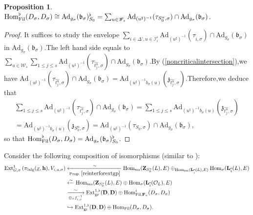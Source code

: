 \documentclass[10pt]{article}
\newtheorem{pro}[thm]{Proposition}
\newcommand{\fil}{{\rm Fil}}
\newcommand{\homo}{{\rm Hom}}
\newcommand{\ext}{{\rm Ext}}
\newcommand{\sm}{{\rm sm}}
\newcommand{\lalg}{{\rm lalg}}
\newcommand{\gr}{{\rm gr}}
\newcommand{\Dpik}{{\mathbf{D}}}
\newcommand{\bF}{{\mathbf{F}}}
\newcommand{\bL}{{\mathbf{L}}}
\newcommand{\bZ}{{\mathbf{Z}}}
\newcommand{\bh}{{\mathbf{h}}}
\newcommand{\cI}{\mathcal I}
\newcommand{\cO}{\mathcal O}
\newcommand{\fb}{{\mathfrak{b}}}
\newcommand{\fz}{{\mathfrak{z}}}
\newcommand{\sW}{\mathscr W}
\begin{document}
\begin{pro}\label{dfnisoforflatfilhomo}
	$\homo^{\flat}_{\fil}(D_{\sigma},D_{\sigma})\cong \mathrm{Ad}_{g_{\sigma}}(\fb_{\sigma})_{S_0}^{\flat}=\sum_{u\in \sW_s}\mathrm{Ad}_{(u^{\sharp})^{-1}}(\tau_{S^u_0,\sigma})\cap \mathrm{Ad}_{g_{\sigma}}(\fb_{\sigma})$.\;
\end{pro}
\begin{proof}
	It suffices to study the envelope $\sum_{i\in\Delta',u\in \cI_{i}^{\flat}}\mathrm{Ad}_{(u^{\sharp})^{-1}}(\tau_{\widehat{i},\sigma})\cap \mathrm{Ad}_{g_{\sigma}}(\fb_{\sigma})$ in $\mathrm{Ad}_{g_{\sigma}}(\fb_{\sigma})$.\;The left hand side equals to 
	$\sum_{u\in \sW_s}\sum_{1\leq j\leq s}\mathrm{Ad}_{(u^{\sharp})^{-1}}(\tau_{\widehat{t^u_j},\sigma})\cap \mathrm{Ad}_{g_{\sigma}}(\fb_{\sigma})$.\;By (\ref{noncriticalintersection}),\;we have $\mathrm{Ad}_{(u^{\sharp})^{-1}}(\tau_{\widehat{{t^u_j}},\sigma})\cap \mathrm{Ad}_{g_{\sigma}}(\fb_{\sigma})=\mathrm{Ad}_{(u^{\sharp})^{-1}b_{\sigma}(u)}(\fz_{\widehat{t^u_j},\sigma})$.\;Therefore,\;we deduce that 
	\begin{equation}
		\begin{aligned}
			\sum_{1\leq j\leq s}\mathrm{Ad}_{(u^{\sharp})^{-1}}(\tau_{\widehat{t^u_j},\sigma})\cap \mathrm{Ad}_{g_{\sigma}}(\fb_{\sigma})=\sum_{1\leq j\leq s}\mathrm{Ad}_{(u^{\sharp})^{-1}b_{\sigma}(u)}(\fz_{\widehat{t^u_j},\sigma})\\
			=\mathrm{Ad}_{(u^{\sharp})^{-1}b_{\sigma}(u)}(\fz_{S^u_0,\sigma})=\mathrm{Ad}_{(u^{\sharp})^{-1}}(\tau_{S_0,\sigma})\cap \mathrm{Ad}_{g_{\sigma}}(\fb_{\sigma}),
		\end{aligned}
	\end{equation}
	so that $\homo^{\flat}_{\fil}(D_{\sigma},D_{\sigma})=\mathrm{Ad}_{g_{\sigma}}(\fb_{\sigma})_{S_0}^{\flat}$.\;
\end{proof}
Consider the following composition of isomorphisms (similar to \cite[(142)-(144)]{BDcritical25}):
\begin{equation}\label{tDmapforiusigma}
	\begin{aligned}
		\ext^1_{G,\sigma}\left(\pi_{\lalg}(\underline{x},\bh),V
		_{i,u,\sigma}\right)&\xleftarrow[\text{Prop.\;}\ref{reinterforextgp}]{\sim}\homo_{\sm}(\bZ_{S^u_0}(L),E)\oplus_{\homo_{\sm}(\bL_{\widehat{i}}(L),E)}\homo_{\sigma}(\bL_{\widehat{i}}(L),E)\\&\xleftarrow{\sim}\homo_{\sm}(\bZ_{S^u_0}(L),E)\oplus\homo_{\sigma}(\bL_{\widehat{i}}(\cO_L),E)\\
		&\xrightarrow[\oplus_{\sigma}f_{i,\sigma}^{-1}]{\sim}\ext^{1,\flat}_{\gr}({\Dpik},{\Dpik})\oplus\homo^i_{\fil,\bF_u}(D_{\sigma},D_{\sigma})\\
		&\hookrightarrow \ext^{1,\flat}_{\gr}({\Dpik},{\Dpik})\oplus\homo_{\fil}(D_{\sigma},D_{\sigma}).\;
	\end{aligned}
\end{equation}
\end{document}
